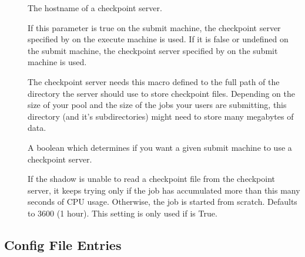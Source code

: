 \begin{description}
  
\item[] \label{param:CkptServerHost} The
  hostname of a checkpoint server.

\item[]
  \label{param:StarterChoosesCkptServer} If this parameter is true on
  the submit machine, the checkpoint server specified by
   on the execute machine is used.  If it is
  false or undefined on the submit machine, the checkpoint server
  specified by  on the submit machine is
  used.
  
\item[] \label{param:CkptServerDir} The
  checkpoint server needs this macro defined to the full path of the
  directory the server should use to store checkpoint files.
  Depending on the size of your pool and the size of the jobs your
  users are submitting, this directory (and it's subdirectories) might
  need to store many megabytes of data.

\item[] \label{param:UseCkptServer} A boolean
  which determines if you want a given submit machine to use a
  checkpoint server.

\item[]
  \label{param:MaxDiscardedRunTime} If the shadow is unable to read a
  checkpoint file from the checkpoint server, it keeps trying only if
  the job has accumulated more than this many seconds of CPU usage.
  Otherwise, the job is started from scratch.  Defaults to 3600 (1
  hour). This setting is only used if  is
  True.

\end{description}


\subsection{\label{sec:Master-Config-File-Entries}
 Config File Entries}

